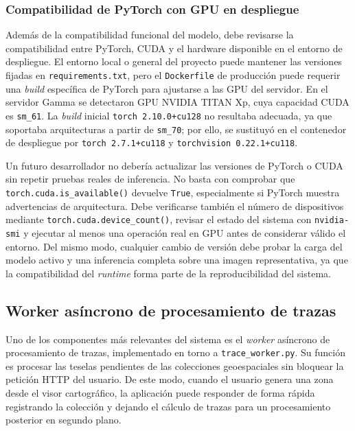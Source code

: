 \subsubsection{Compatibilidad de PyTorch con GPU en despliegue}

Además de la compatibilidad funcional del modelo, debe revisarse la compatibilidad entre PyTorch, CUDA y el hardware disponible en el entorno de despliegue. El entorno local o general del proyecto puede mantener las versiones fijadas en \texttt{requirements.txt}, pero el \texttt{Dockerfile} de producción puede requerir una \textit{build} específica de PyTorch para ajustarse a las GPU del servidor. En el servidor Gamma se detectaron GPU NVIDIA TITAN Xp, cuya capacidad CUDA es \texttt{sm\_61}. La \textit{build} inicial \texttt{torch 2.10.0+cu128} no resultaba adecuada, ya que soportaba arquitecturas a partir de \texttt{sm\_70}; por ello, se sustituyó en el contenedor de despliegue por \texttt{torch 2.7.1+cu118} y \texttt{torchvision 0.22.1+cu118}.

Un futuro desarrollador no debería actualizar las versiones de PyTorch o CUDA sin repetir pruebas reales de inferencia. No basta con comprobar que \texttt{torch.cuda.is\_available()} devuelve \texttt{True}, especialmente si PyTorch muestra advertencias de arquitectura. Debe verificarse también el número de dispositivos mediante \texttt{torch.cuda.device\_count()}, revisar el estado del sistema con \texttt{nvidia-smi} y ejecutar al menos una operación real en GPU antes de considerar válido el entorno. Del mismo modo, cualquier cambio de versión debe probar la carga del modelo activo y una inferencia completa sobre una imagen representativa, ya que la compatibilidad del \textit{runtime} forma parte de la reproducibilidad del sistema.

\subsection{Worker asíncrono de procesamiento de trazas} 

Uno de los componentes más relevantes del sistema es el \textit{worker} asíncrono de procesamiento de trazas, implementado en torno a \texttt{trace\_worker.py}. Su función es procesar las teselas pendientes de las colecciones geoespaciales sin bloquear la petición HTTP del usuario. De este modo, cuando el usuario genera una zona desde el visor cartográfico, la aplicación puede responder de forma rápida registrando la colección y dejando el cálculo de trazas para un procesamiento posterior en segundo plano.

